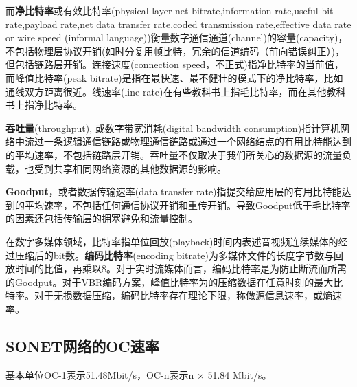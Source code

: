 而\textbf{净比特率}或有效比特率(physical layer net bitrate,information rate,useful bit rate,payload rate,net data transfer rate,coded transmission rate,effective data rate or wire speed (informal language))衡量数字通信通道(channel)的容量(capacity)，不包括物理层协议开销(如时分复用帧比特，冗余的信道编码（前向错误纠正）)，但包括链路层开销。连接速度(connection speed，不正式)指净比特率的当前值，而峰值比特率(peak bitrate)是指在最快速、最不健壮的模式下的净比特率，比如通线双方距离很近。线速率(line rate)在有些教科书上指毛比特率，而在其他教科书上指净比特率。

\textbf{吞吐量}(throughput), 或数字带宽消耗(digital bandwidth consumption)指计算机网络中流过一条逻辑通信链路或物理通信链路或通过一个网络结点的有用比特能达到的平均速率，不包括链路层开销。吞吐量不仅取决于我们所关心的数据源的流量负载，也受到共享相同网络资源的其他数据源的影响。

\textbf{Goodput}，或者数据传输速率(data transfer rate)指提交给应用层的有用比特能达到的平均速率，不包括任何通信协议开销和重传开销。导致Goodput低于毛比特率的因素还包括传输层的拥塞避免和流量控制。

在数字多媒体领域，比特率指单位回放(playback)时间内表述音视频连续媒体的经过压缩后的bit数。\textbf{编码比特率}(encoding bitrate)为多媒体文件的长度字节数与回放时间的比值，再乘以8。对于实时流媒体而言，编码比特率是为防止断流而所需的Goodput。对于VBR编码方案，峰值比特率为的压缩数据在任意时刻的最大比特率。对于无损数据压缩，编码比特率存在理论下限，称做源信息速率，或熵速率。

\subsection{SONET网络的OC速率}
基本单位OC-1表示51.48Mbit/s，OC-n表示n × 51.84 Mbit/s。



